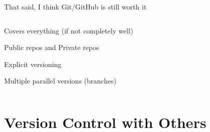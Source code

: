 \documentclass[ignorenonframetext, 10pt, aspectratio=169]{beamer}
\begin{document}
\begin{frame}{That said, I think Git/GitHub is still worth it}
\begin{columns}[T]
\begin{column}{0.6\textwidth}
\begin{wideitemize}
\item Covers everything (if not completely well)
\item Public repos and Private repos
\item Explicit versioning
\item Multiple parallel versions (branches)
\end{wideitemize}
\end{column}
\end{columns}
\end{frame}

\section{Version Control with Others}
\end{document}
